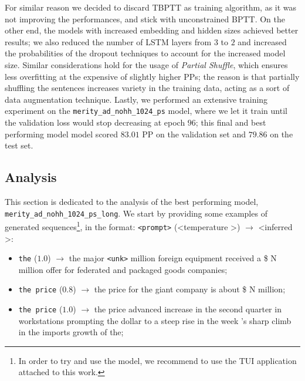 For similar reason we decided to discard TBPTT as training algorithm, as it was not improving the performances, and stick with unconstrained BPTT. On the other end, the models with increased embedding and hidden sizes achieved better results; we also reduced the number of LSTM layers from $3$ to $2$ and increased the probabilities of the dropout techniques to account for the increased model size. Similar considerations hold for the usage of \emph{Partial Shuffle}, which ensures less overfitting at the expensive of slightly higher PPs; the reason is that partially shuffling the sentences increases variety in the training data, acting as a sort of data augmentation technique. Lastly, we performed an extensive training experiment on the \texttt{merity\_ad\_nohh\_1024\_ps} model, where we let it train until the validation loss would stop decreasing at epoch $96$; this final and best performing model model scored $83.01$ PP on the validation set and $79.86$ on the test set.

\subsection{Analysis}
This section is dedicated to the analysis of the best performing model, \texttt{merity\_ad\_nohh\_1024\_ps\_long}. We start by providing some examples of generated sequences\footnote{In order to try and use the model, we recommend to use the  TUI application attached to this work.}, in the format: \texttt{<prompt>} (\textless temperature \textgreater) $\rightarrow$ \textless inferred \textgreater:
\begin{itemize}
    \item \texttt{the} ($1.0$) $\rightarrow$ the major \texttt{<unk>} million foreign equipment received a \$ N million offer for federated and packaged goods companies;
    \item \texttt{the price} ($0.8$) $\rightarrow$ the price for the giant company is about \$ N million;
    \item \texttt{the price} ($1.0$) $\rightarrow$ the price advanced increase in the second quarter in workstations prompting the dollar to a steep rise in the week 's sharp climb in the imports growth of the;
\end{itemize}

